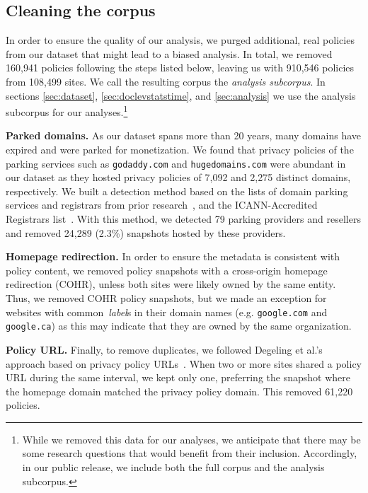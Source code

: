 \subsection{Cleaning the corpus}
\label{sec:deduplication}
In order to ensure the quality of our analysis, we purged additional, real policies from our dataset that might lead to a biased analysis. In total, we removed 160,941 policies following the steps listed below, leaving us with 910,546 policies from 108,499 sites. We call the resulting corpus the \textit{analysis subcorpus}. In sections \ref{sec:dataset}, \ref{sec:doclevstatstime}, and \ref{sec:analysis} we use the analysis subcorpus for our analyses.\footnote{While we removed this data for our analyses, we anticipate that there may be some research questions that would benefit from their inclusion. Accordingly, in our public release, we include both the full corpus and the analysis subcorpus.} 

\textbf{Parked domains.} As our dataset spans more than 20 years,
many domains have expired and were parked for monetization.
We found that privacy policies of the parking services such as {\tt godaddy.com} and {\tt hugedomains.com} were abundant in our dataset as they hosted privacy policies of 7,092 and 2,275 distinct domains, respectively.
We built a detection method based on the lists of domain parking services and registrars from prior research~\cite{vissers2015parking, kuhrer2014paint, kuhrer2014paint-TR, wang2006strider},
and the ICANN-Accredited Registrars list~\cite{ICANN-Registrars}.
With this method, we detected 79 parking providers and resellers and removed 24,289 (2.3\%) snapshots hosted by these providers.
 
\textbf{Homepage redirection.} In order to ensure the metadata is consistent with policy content, we removed policy snapshots with a cross-origin homepage redirection (COHR), unless both sites were likely owned by the same entity. Thus, we removed COHR policy snapshots, but we made an exception for websites with
common~\emph{label}s in their domain names (e.g. \texttt{google.com} and \texttt{google.ca})
as this may indicate that they are owned by the same organization.

\textbf{Policy URL.} Finally, to remove duplicates, we followed
Degeling et al.'s approach based on privacy policy URLs~\cite{degeling2018we}. When two or more sites shared a policy URL during the same interval, we kept only one, preferring the snapshot where the homepage domain matched the privacy policy domain. This removed 61,220 policies.



